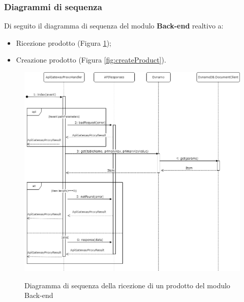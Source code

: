 \subsubsection{Diagrammi di sequenza}
Di seguito il diagramma di sequenza del modulo \textbf{Back-end} realtivo a:
\begin{itemize}
	\item Ricezione prodotto (Figura \ref{fig:getProduct});
	\item Creazione prodotto (Figura \ref{fig:createProduct}).
\end{itemize}

\vspace{1cm}

\begin{figure}[H]
\centering
\includegraphics[scale=0.43]{res/Architettura/Backend/img/diagrammaSequenzaRicezioneProdotto.png}\\
\caption{Diagramma di sequenza della ricezione di un prodotto del modulo Back-end}
\label{fig:getProduct}
\end{figure}

\vspace{1cm}

